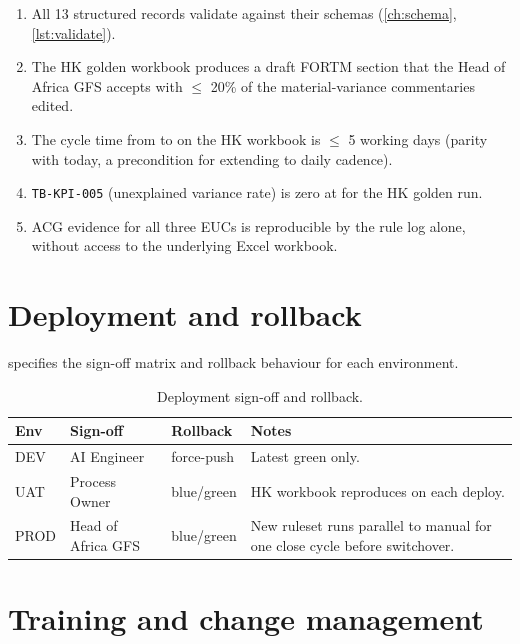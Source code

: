 \begin{enumerate}
  \item All 13 structured records validate against their schemas
        (\cref{ch:schema}, \cref{lst:validate}).
  \item The HK golden workbook produces a draft FORTM section that
        the Head of Africa GFS accepts with $\le$ 20\% of the
        material-variance commentaries edited.
  \item The cycle time from  to
         on the HK workbook is $\le$ 5 working
        days (parity with today, a precondition for extending to daily
        cadence).
  \item \texttt{TB-KPI-005} (unexplained variance rate) is zero at
         for the HK golden run.
  \item ACG evidence for all three EUCs is reproducible by the rule
        log alone, without access to the underlying Excel workbook.
\end{enumerate}

\section{Deployment and rollback}

 specifies the sign-off matrix and rollback
behaviour for each environment.

\begin{table}[htbp]
\caption{Deployment sign-off and rollback.}\label{tab:deployment}
\centering
\footnotesize
\begin{tabularx}{\linewidth}{@{}lllX@{}}
\toprule
\textbf{Env} & \textbf{Sign-off} & \textbf{Rollback} & \textbf{Notes} \\ \midrule
DEV  & AI Engineer        & force-push   & Latest green only. \\
UAT  & Process Owner      & blue/green   & HK workbook reproduces on each deploy. \\
PROD & Head of Africa GFS & blue/green   & New ruleset runs parallel to manual for one close cycle before switchover. \\
\bottomrule
\end{tabularx}
\end{table}

\section{Training and change management}

